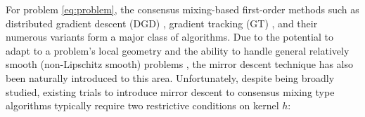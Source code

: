 \documentclass{article}
\theoremstyle{plain}
\theoremstyle{definition}
\theoremstyle{remark}
\newcommand{\cD}{\mathcal{D}_{h}}
\begin{document}
For problem \eqref{eq:problem}, the consensus mixing-based first-order methods such as distributed gradient descent ({\sf DGD}) \cite{Tsitsiklis1986Distributed,Nedic2009Distributed,Nedic2015Directed,Yuan2016DGD}, gradient tracking ({\sf GT}) \cite{Qu2018Harnessing}, and their numerous variants \cite{Shi2015EXTRA,Nedic2017DIGing,Scutari2019SONATA,Yuan2019ExactDiffusionI} form a major class of algorithms. Due to the potential to adapt to a problem's local geometry and the ability to handle general relatively smooth (non-Lipschitz smooth) problems \cite{bauschke2017descent,bolte2018first,lu2018relatively}, the mirror descent technique \cite{nemirovsky1983problem} has also been naturally introduced to this area. 
Unfortunately, despite being broadly studied, existing trials to introduce mirror descent to consensus mixing type algorithms typically require two restrictive conditions on kernel $h$: 
\end{document}
